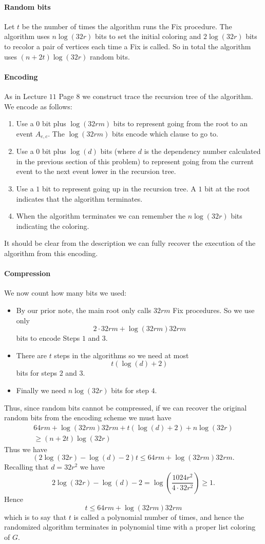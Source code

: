 \documentclass[letterpaper,12pt,oneside,onecolumn]{article}
\begin{document}
\paragraph{Random bits}
Let $t$ be the number of times the algorithm runs the Fix procedure. The algorithm uses $n\log(32r)$ bits to set the initial coloring and $2\log(32r)$ bits to recolor a pair of vertices each time a Fix is called. So in total the algorithm uses $(n+2t)\log(32r)$ random bits.
\paragraph{Encoding}
As in Lecture $11$ Page $8$ we construct trace the recursion tree of the algorithm. We encode as follows:
\begin{enumerate}
    \item Use a $0$ bit plus $\log(32rm)$ bits to represent going from the root to an event $A_{e,c}$. The $\log(32rm)$ bits encode which clause to go to.
    \item Use a $0$ bit plus $\log(d)$ bits (where $d$ is the dependency number calculated in the previous section of this problem) to represent going from the current event to the next event lower in the recursion tree.
    \item Use a $1$ bit to represent going up in the recursion tree. A $1$ bit at the root indicates that the algorithm terminates.
    \item When the algorithm terminates we can remember the $n\log(32r)$ bits indicating the coloring.
\end{enumerate}
It should be clear from the description we can fully recover the execution of the algorithm from this encoding.
\paragraph{Compression}
We now count how many bits we used:
\begin{itemize}
    \item By our prior note, the main root only calls $32rm$ Fix procedures. So we use only 
    $$2\cdot32rm + \log(32rm)32rm$$
    bits to encode Steps $1$ and $3$.
    \item There are $t$ steps in the algorithms so we need at most $$ t(\log(d) + 2)$$
    bits for steps $2$ and $3$.
    \item Finally we need $n\log(32r)$ bits for step $4$.
\end{itemize}
Thus, since random bits cannot be compressed, if we can recover the original random bits from the encoding scheme we must have
\begin{align*}
    64rm + \log(32rm)32rm +t(\log(d) + 2) +n\log(32r)\\
    \geq (n+2t)\log(32r)
\end{align*}
Thus we have
$$(2\log(32r) -\log(d) -2)t \leq 64rm + \log(32rm)32rm.$$
Recalling that $d = 32r^2$ we have
$$2\log(32r) -\log(d) - 2 =\log(\frac{1024r^2}{4\cdot32r^2}) \geq 1.$$
Hence $$t \leq 64rm + \log(32rm)32rm$$
which is to say that $t$ is called a polynomial number of times, and hence the randomized algorithm terminates in polynomial time with a proper list coloring of $G$.
\end{document}
